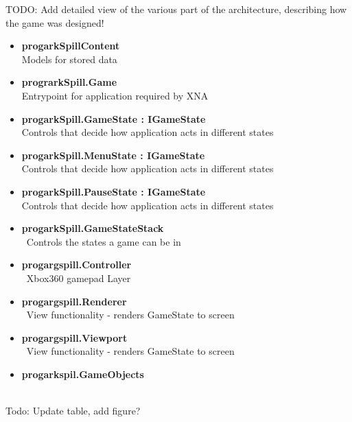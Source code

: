 

TODO: Add detailed view of the various part of the architecture, describing how the game was designed!

\begin{itemize}
	\item \textbf{progarkSpillContent} \\ Models for stored data
	\item \textbf{prograrkSpill.Game} \\ Entrypoint for application required by XNA
	\item \textbf{progarkSpill.GameState : IGameState} \\ Controls that decide how application acts in different states 
	\item \textbf{progarkSpill.MenuState : IGameState} \\ Controls that decide how application acts in different states 
	\item \textbf{progarkSpill.PauseState : IGameState} \\ Controls that decide how application acts in different states 
	\item \textbf{progarkSpill.GameStateStack} \\ Controls the states a game can be in		
	\item \textbf{progargspill.Controller} \\ Xbox360 gamepad Layer
	\item \textbf{progargspill.Renderer} \\ View functionality - renders GameState to screen 
	\item \textbf{progargspill.Viewport} \\ View functionality - renders GameState to screen
	\item \textbf{progarkspil.GameObjects} \\ 
\end{itemize}

Todo: Update table, add figure?

